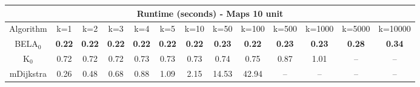 \begin{tabular}{c|cccccccccccc}\toprule
\multicolumn{13}{c}{Runtime (seconds) - Maps 10 unit}\\ \midrule
Algorithm & k=1 & k=2 & k=3 & k=4 & k=5 & k=10 & k=50 & k=100 & k=500 & k=1000 & k=5000 & k=10000 \\ \midrule
BELA$_0$ & \textbf{0.22} & \textbf{0.22} & \textbf{0.22} & \textbf{0.22} & \textbf{0.22} & \textbf{0.22} & \textbf{0.23} & \textbf{0.22} & \textbf{0.23} & \textbf{0.23} & \textbf{0.28} & \textbf{0.34} \\
K$_0$ & 0.72 & 0.72 & 0.72 & 0.73 & 0.73 & 0.73 & 0.74 & 0.75 & 0.87 & 1.01 & -- & -- \\
mDijkstra & 0.26 & 0.48 & 0.68 & 0.88 & 1.09 & 2.15 & 14.53 & 42.94 & -- & -- & -- & -- \\ \bottomrule 
\end{tabular}
